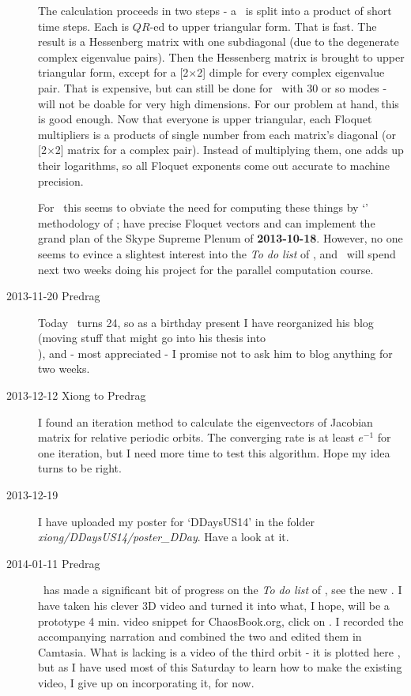 \begin{description}
The calculation proceeds in two steps - a \JacobianM\ is split into a
product of short time steps. Each is $QR$-ed to upper triangular form.
That is fast. The result is a Hessenberg matrix with one subdiagonal (due
to the degenerate complex eigenvalue pairs). Then the Hessenberg matrix
is brought to upper triangular form, except for a [2$\times$2] dimple for
every complex eigenvalue pair. That is expensive, but can still be done
for \KS\ with 30 or so modes - will not be doable for very high
dimensions. For our problem at hand, this is good enough. Now that
everyone is upper triangular, each Floquet multipliers is a products of
single number from each matrix's diagonal (or [2$\times$2] matrix for a
complex pair). Instead of multiplying them, one adds up their logarithms,
so all Floquet exponents come out accurate to machine precision.

For \KS\ this seems to obviate the need for computing these things by
`{\cLvs}' methodology of
; have precise Floquet vectors and can implement the grand
plan of the Skype Supreme Plenum of {\bf 2013-10-18}.
However, no one seems to evince a slightest interest into the {\em To do list} of
, and \XD\ will spend next two weeks doing his
project for the parallel computation course.

\item[2013-11-20 Predrag]
Today \XD\ turns 24, so as a birthday present I have reorganized
his blog (moving stuff that might go into his thesis into
\\
), and - most appreciated - I promise not to
ask him to blog anything for two weeks.

\item[2013-12-12 Xiong to Predrag]
I found an iteration method to calculate the eigenvectors of Jacobian
matrix for relative periodic orbits. The converging rate is at least
$e^{-1}$ for one iteration, but I need more time to test this algorithm.
Hope my idea turns to be right.

\item[2013-12-19] I have uploaded my poster for `DDaysUS14' in the folder \\
\textit{xiong/DDaysUS14/poster\_DDay}. Have a look at it.

\item[2014-01-11 Predrag] \XD\ has made a significant bit of
progress on the {\em To do list} of , see the
new . I have taken his clever 3D video and turned it into
what, I hope, will be a prototype 4 min. video snippet for ChaosBook.org,
click on
. I
recorded the accompanying narration and combined the two and edited them
in Camtasia. What is lacking is a video of the third orbit 
- it is plotted here , but as
I have used most of this Saturday to learn how to make the existing
video, I give up on incorporating it, for now.


\end{description}
